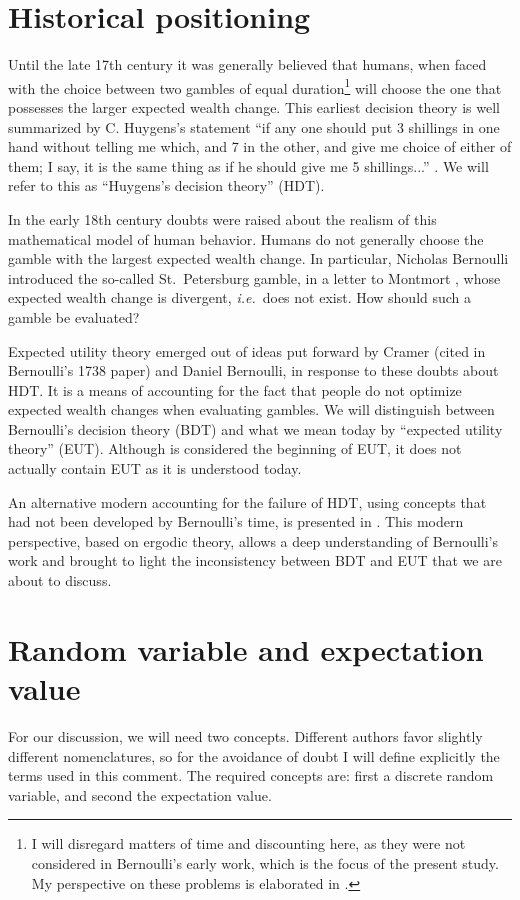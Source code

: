\documentclass[pdftex]{article}
\newcommand{\ie}{{\it i.e.}\ }
\newcommand{\seclabel}[1]{\label{section:#1}}
\begin{document}
\section{Historical positioning}
\seclabel{Historical}
Until the late 17th century it was generally believed that humans, when faced with the choice between two gambles of equal duration\footnote{I will disregard matters of time and discounting here, as they were not considered in Bernoulli's early work, which is the focus of the present study. My perspective on these problems is elaborated in \cite{PetersGell-Mann2016}.} will choose the one that possesses the larger expected wealth change. This earliest decision theory is well summarized by C. Huygens's statement ``if any one should put 3 shillings in one hand without telling me which, and 7 in the other, and give me choice of either of them; I say, it is the same thing as if he should give me 5 shillings...'' \cite{Huygens1657}. We will refer to this as ``Huygens's decision theory'' (HDT). 

In the early 18th century doubts were raised about the realism of this mathematical model of human behavior. Humans do not generally choose the gamble with the largest expected wealth change. In particular, Nicholas Bernoulli introduced the so-called St.~Petersburg gamble, in a letter to Montmort \cite[p.~402]{Montmort1713}, whose expected wealth change is divergent, \ie does not exist. How should such a gamble be evaluated?

Expected utility theory emerged out of ideas put forward by Cramer (cited in Bernoulli's 1738 paper) and Daniel Bernoulli, in response to these doubts about HDT. It is a means of accounting for the fact that people do not optimize expected wealth changes when evaluating gambles. We will distinguish between Bernoulli's decision theory (BDT) and what we mean today by ``expected utility theory'' (EUT). Although \cite{Bernoulli1738} is considered the beginning of EUT, it does not actually contain EUT as it is understood today.

An alternative modern accounting for the failure of HDT, using concepts that had not been developed by Bernoulli's time, is presented in \cite{PetersGell-Mann2016}. This modern perspective, based on ergodic theory, allows a deep understanding of Bernoulli's work and brought to light the inconsistency between BDT and EUT that we are about to discuss.

\section{Random variable and expectation value}
\seclabel{Mathematical}
For our discussion, we will need two concepts. Different authors favor slightly different nomenclatures, so for the avoidance of doubt I will define explicitly the terms used in this comment. The required concepts are: first a discrete random variable, and second the expectation value. 
\end{document}

